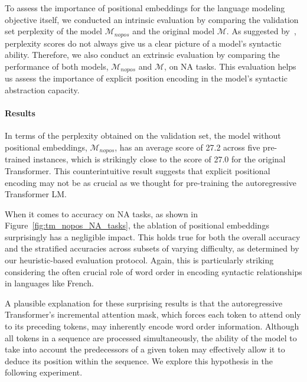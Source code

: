 To assess the importance of positional embeddings for the language modeling objective itself, we conducted an intrinsic evaluation by comparing the validation set perplexity of the model $\mathcal{M}_{nopos}$ and the original model $\mathcal{M}$. As suggested by~\cite{hu-etal-2020-systematic}, perplexity scores do not always give us a clear picture of a model's syntactic ability. Therefore, we also conduct an extrinsic evaluation by comparing the performance of both models, $\mathcal{M}_{nopos}$ and $\mathcal{M}$, on NA tasks. This evaluation helps us assess the importance of explicit position encoding in the model's syntactic abstraction capacity.

\paragraph{Results}  In terms of the perplexity obtained on the validation set, the model without positional embeddings, $\mathcal{M}_{nopos}$, has an average score of 27.2 across five pre-trained instances, which is strikingly close to the score of 27.0 for the original Transformer. This counterintuitive result suggests that explicit positional encoding may not be as crucial as we thought for pre-training the autoregressive Transformer LM. 

When it comes to accuracy on NA tasks, as shown in Figure~\ref{fig:tm_nopos_NA_tasks}, the ablation of positional embeddings surprisingly has a negligible impact. This holds true for both the overall accuracy and the stratified accuracies across subsets of varying difficulty, as determined by our heuristic-based evaluation protocol. Again, this is particularly striking considering the often crucial role of word order in encoding syntactic relationships in languages like French.

A plausible explanation for these surprising results is that the autoregressive Transformer's incremental attention mask, which forces each token to attend only to its preceding tokens, may inherently encode word order information. Although all tokens in a sequence are processed simultaneously, the ability of the model to take into account the predecessors of a given token may effectively allow it to deduce its position within the sequence. We explore this hypothesis in the following experiment. 



